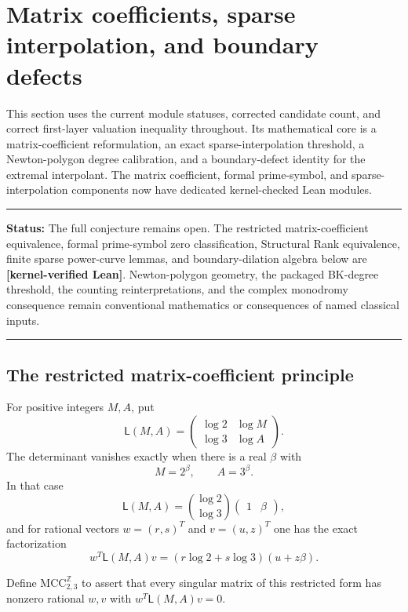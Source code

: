 \documentclass[11pt,oneside]{article}
\theoremstyle{definition}
\theoremstyle{remark}
\newcommand{\statuslean}{\textcolor{leanblue}{\textbf{[kernel-verified Lean]}}}
\newenvironment{statusbox}[1]
{\begin{center}\begin{minipage}{0.94\textwidth}\raggedright\hbadness=10000\hrule
\vspace{0.45em}\textbf{Status:} #1\par\vspace{0.35em}}
{\vspace{0.35em}\hrule\end{minipage}\end{center}}
\begin{document}
\section{Matrix coefficients, sparse interpolation, and boundary defects}
\label{sec:matrix-sparse-boundary}

This section uses the current module statuses, corrected candidate count, and correct
first-layer valuation inequality throughout.  Its mathematical core is a
matrix-coefficient reformulation, an exact sparse-interpolation threshold, a Newton-polygon
degree calibration, and a boundary-defect identity for the extremal interpolant.  The matrix
coefficient, formal prime-symbol, and sparse-interpolation components now have dedicated
kernel-checked Lean modules.

\begin{statusbox}{The full conjecture remains open.  The restricted matrix-coefficient
equivalence, formal prime-symbol zero classification, Structural Rank equivalence, finite
sparse power-curve lemmas, and boundary-dilation algebra below are \statuslean.
Newton-polygon geometry, the packaged BK-degree threshold, the counting reinterpretations,
and the complex monodromy consequence remain conventional mathematics or consequences of
named classical inputs.}
\end{statusbox}

\subsection{The restricted matrix-coefficient principle}
\label{mc:restricted}

For positive integers $M,A$, put
\[
  \mathsf L(M,A)=
  \begin{pmatrix}
    \log2&\log M\\
    \log3&\log A
  \end{pmatrix}.
\]
The determinant vanishes exactly when there is a real $\beta$ with
\[
  M=2^\beta,\qquad A=3^\beta.
\]
In that case
\[
  \mathsf L(M,A)=
  \binom{\log2}{\log3}\begin{pmatrix}1&\beta\end{pmatrix},
\]
and for rational vectors $w=(r,s)^T$ and $v=(u,z)^T$ one has the exact factorization
\begin{equation}
  w^T\mathsf L(M,A)v
   =(r\log2+s\log3)(u+z\beta).
  \label{mc:eq-factor}
\end{equation}

Define $\mathrm{MCC}_{2,3}^{\mathbb Z}$ to assert that every singular matrix of this
restricted form has nonzero rational $w,v$ with $w^T\mathsf L(M,A)v=0$.
\end{document}
